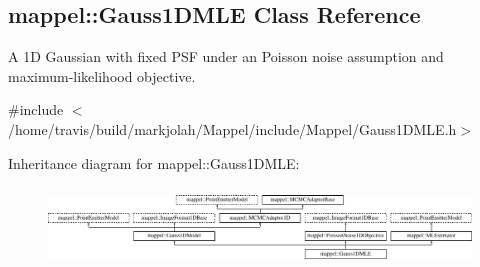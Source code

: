 \hypertarget{classmappel_1_1Gauss1DMLE}{}\subsection{mappel\+:\+:Gauss1\+D\+M\+LE Class Reference}
\label{classmappel_1_1Gauss1DMLE}


A 1D Gaussian with fixed P\+SF under an Poisson noise assumption and maximum-\/likelihood objective.  




{\ttfamily \#include $<$/home/travis/build/markjolah/\+Mappel/include/\+Mappel/\+Gauss1\+D\+M\+L\+E.\+h$>$}

Inheritance diagram for mappel\+:\+:Gauss1\+D\+M\+LE\+:\begin{figure}[H]
\begin{center}
\leavevmode
\includegraphics[height=2.113208cm]{classmappel_1_1Gauss1DMLE}
\end{center}
\end{figure}
